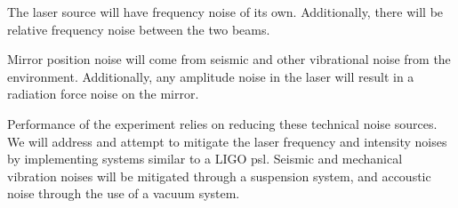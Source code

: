The laser source will have frequency noise of its own. Additionally, there will
be relative frequency noise between the two beams.

Mirror position noise will come from seismic and other vibrational noise from the
environment.
Additionally, any amplitude noise in the laser will result in a radiation force
noise on the mirror.

Performance of the experiment relies on reducing these technical noise sources.
We will address and attempt to mitigate the laser frequency and intensity noises
by implementing systems similar to a LIGO \ac{psl}.
Seismic and mechanical vibration noises will be mitigated through a suspension
system, and accoustic noise through the use of a vacuum system.





